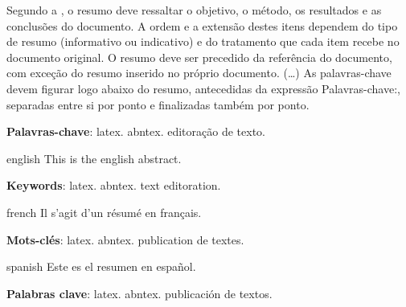 \documentclass[
	12pt,				%
	openright,			%
	twoside,			%
	a4paper,			%
	english,			%
	french,				%
	spanish,			%
	brazil				%
	]{abntex2}
\newcommand{\listofquadrosname}{Lista de quadros}
\begin{document}
\setlength{\absparsep}{18pt} %
\begin{resumo}
 Segundo a , o resumo deve ressaltar o
 objetivo, o método, os resultados e as conclusões do documento. A ordem e a extensão
 destes itens dependem do tipo de resumo (informativo ou indicativo) e do
 tratamento que cada item recebe no documento original. O resumo deve ser
 precedido da referência do documento, com exceção do resumo inserido no
 próprio documento. (\ldots) As palavras-chave devem figurar logo abaixo do
 resumo, antecedidas da expressão Palavras-chave:, separadas entre si por
 ponto e finalizadas também por ponto.

 \textbf{Palavras-chave}: latex. abntex. editoração de texto.
\end{resumo}

\begin{resumo}[Abstract]
 \begin{otherlanguage*}{english}
   This is the english abstract.

   \vspace{\onelineskip}
 
   \noindent 
   \textbf{Keywords}: latex. abntex. text editoration.
 \end{otherlanguage*}
\end{resumo}

\begin{resumo}[Résumé]
 \begin{otherlanguage*}{french}
    Il s'agit d'un résumé en français.
 
   \textbf{Mots-clés}: latex. abntex. publication de textes.
 \end{otherlanguage*}
\end{resumo}

\begin{resumo}[Resumen]
 \begin{otherlanguage*}{spanish}
   Este es el resumen en español.
  
   \textbf{Palabras clave}: latex. abntex. publicación de textos.
 \end{otherlanguage*}
\end{resumo}

\listoffigures*
\cleardoublepage

\pdfbookmark[0]{\listofquadrosname}{loq}
\listofquadros*
\cleardoublepage
\end{document}
